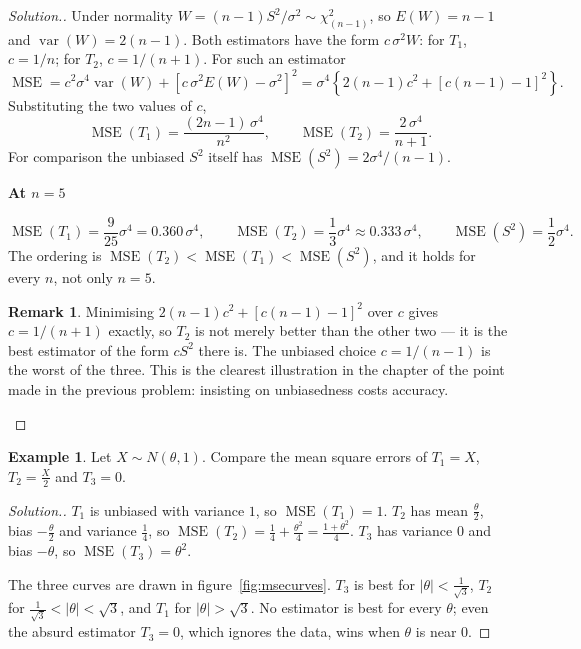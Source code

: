 \documentclass[12pt,a4paper]{report}
\theoremstyle{definition}
\newtheorem{exa}[thm]{Example}
\newtheorem*{remark}{Remark}
\newcommand{\subhead}[1]{%
  \par\medskip\noindent\textbf{#1}\par\nobreak\smallskip}
\DeclareMathOperator{\var}{var}
\DeclareMathOperator{\MSE}{MSE}
\newenvironment{solution}
  {\renewcommand{\qedsymbol}{}\begin{proof}[\textit{Solution}.]}
  {\end{proof}}
\begin{document}
\begin{solution}
Under normality $W = (n-1)S^{2}/\sigma^{2} \sim \chi^{2}_{(n-1)}$, so
$E(W)=n-1$ and $\var(W)=2(n-1)$. Both estimators have the form
$c\,\sigma^{2}W$: for $T_1$, $c=1/n$; for $T_2$, $c=1/(n+1)$. For such an
estimator
\[\MSE  = c^{2}\sigma^{4}\var(W) + \left[c\,\sigma^{2}E(W) - \sigma^{2}\right]^{2}
= \sigma^{4}\left\{2(n-1)c^{2} + \left[c(n-1)-1\right]^{2}\right\}.\]
Substituting the two values of $c$,
\[\MSE (T_1) = \frac{(2n-1)\,\sigma^{4}}{n^{2}},\qquad
\MSE (T_2) = \frac{2\,\sigma^{4}}{n+1} .\]
For comparison the unbiased $S^{2}$ itself has $\MSE (S^{2}) = 2\sigma^{4}/(n-1)$.

\subhead{At $n=5$}
\[\MSE (T_1) = \frac{9}{25}\sigma^{4} = 0.360\,\sigma^{4},\qquad
\MSE (T_2) = \frac{1}{3}\sigma^{4} \approx 0.333\,\sigma^{4},\qquad
\MSE (S^{2}) = \frac{1}{2}\sigma^{4} .\]
The ordering is $\MSE (T_2) < \MSE (T_1) < \MSE (S^{2})$, and it holds for every
$n$, not only $n=5$.

\begin{remark}
Minimising $2(n-1)c^{2} + \left[c(n-1)-1\right]^{2}$ over $c$ gives
$c = 1/(n+1)$ exactly, so $T_2$ is not merely better than the other two --- it is
the best estimator of the form $cS^{2}$ there is. The unbiased choice
$c=1/(n-1)$ is the worst of the three. This is the clearest illustration in the
chapter of the point made in the previous problem: insisting on unbiasedness
costs accuracy.
\end{remark}
\end{solution}

\begin{exa}
\label{ex:normalmse}
Let $X\sim N(\theta, 1)$. Compare the mean square errors of
$T_1 = X$, $T_2 = \frac X2$ and $T_3 = 0$.
\end{exa}

\begin{solution}
$T_1$ is unbiased with variance $1$, so $\MSE(T_1) = 1$. $T_2$ has mean
$\frac\theta2$, bias $-\frac\theta2$ and variance $\frac14$, so
$\MSE(T_2) = \frac14 + \frac{\theta^2}{4} = \frac{1 + \theta^2}{4}$. $T_3$ has
variance $0$ and bias $-\theta$, so $\MSE(T_3) = \theta^2$.

The three curves are drawn in figure~\ref{fig:msecurves}. $T_3$ is best for
$|\theta|<\frac{1}{\sqrt3}$, $T_2$ for $\frac{1}{\sqrt3}<|\theta|<\sqrt3$, and $T_1$
for $|\theta|>\sqrt3$. No estimator is best for every $\theta$; even the absurd
estimator $T_3 = 0$, which ignores the data, wins when $\theta$ is near $0$.
\end{solution}
\end{document}
